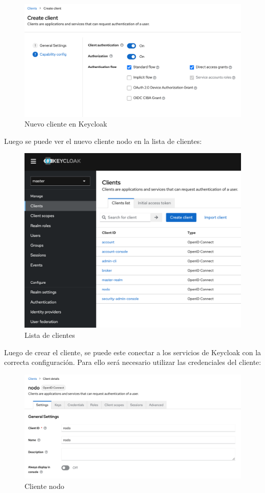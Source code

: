 \begin{figure}[H]
	\centering
	\includegraphics[width=1\linewidth]{Graphics/client_new2}
	\caption{Nuevo cliente en Keycloak}
	\label{fig:clientnew2}
\end{figure}

Luego se puede ver el nuevo cliente nodo en la lista de clientes:

\begin{figure}[H]
	\centering
	\includegraphics[width=0.9\linewidth]{Graphics/client_list}
	\caption{Lista de clientes}
	\label{fig:clientlist}
\end{figure}

Luego de crear el cliente, se puede este conectar a los servicios de Keycloak con la correcta configuración. Para ello será necesario utilizar las credenciales del cliente:

\begin{figure}[H]
	\centering
	\includegraphics[width=0.9\linewidth]{Graphics/client_nodo}
	\caption{Cliente nodo}
	\label{fig:clientnodo}
\end{figure}

